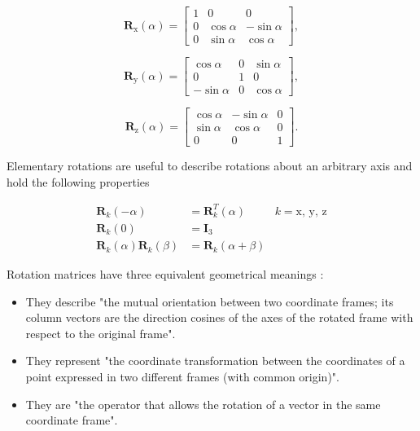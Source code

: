 \begin{equation}
    \boldsymbol{R}_{\text{x}}(\alpha) = 
    \begin{bmatrix} 1 & 0 & 0\\
    0 & \cos{\alpha} & -\sin{\alpha}\\
    0 & \sin{\alpha} & \cos{\alpha}
    \end{bmatrix},
\end{equation}

\begin{equation}
    \boldsymbol{R}_{\text{y}}(\alpha) = \begin{bmatrix} \cos{\alpha} & 0 & \sin{\alpha}\\
    0 & 1 & 0\\
    -\sin{\alpha} & 0 & \cos{\alpha}
    \end{bmatrix},
\end{equation}

\begin{equation}
    \boldsymbol{R}_{\text{z}}(\alpha) = 
    \begin{bmatrix} \cos{\alpha} & -\sin{\alpha} & 0\\
    \sin{\alpha} & \cos{\alpha} & 0\\
    0 & 0 & 1
    \end{bmatrix}.
\end{equation}

Elementary rotations are useful to describe rotations about an arbitrary axis and hold the following properties \cite{Siciliano2009_robotics_modelling_planning_control, Spong2005_robot_dynamics_control} 

\begin{align}
    \boldsymbol{R}_{k}(-\alpha) &= \boldsymbol{R}_{k}^{T}(\alpha) & k = \text{x, y, z}\\
    \boldsymbol{R}_{k}(0) &= \boldsymbol{I}_3 & \\
    \boldsymbol{R}_{k}(\alpha)\boldsymbol{R}_{k}(\beta) &= \boldsymbol{R}_{k}(\alpha+\beta) &
\end{align}

Rotation matrices have three equivalent geometrical meanings \cite{Siciliano2009_robotics_modelling_planning_control}:

\begin{itemize}
    \item They describe "the mutual orientation between two coordinate frames; its column vectors are the direction cosines of the axes of the rotated frame with respect to the original frame".
    \item They represent "the coordinate transformation between the coordinates of a point expressed in two different frames (with common origin)".
    \item They are "the operator that allows the rotation of a vector in the same coordinate frame".
\end{itemize}


